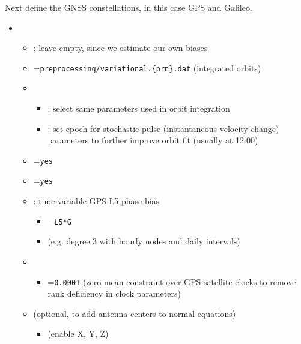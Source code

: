 Next define the GNSS constellations, in this case GPS and Galileo.
\begin{itemize}
  \item {}
  \begin{itemize}
    \item {}: leave empty, since we estimate our own biases
    \item {}=\verb|preprocessing/variational.{prn}.dat| (integrated orbits)
    \item {}
    \begin{itemize}
      \item {}:
            select same parameters used in orbit integration
      \item {}: set epoch for stochastic pulse (instantaneous velocity change) parameters to further
            improve orbit fit (usually at 12:00)
    \end{itemize}
    \item {}=\verb|yes|
    \item {}=\verb|yes|
    \item {}: time-variable GPS L5 phase bias
    \begin{itemize}
      \item {}=\verb|L5*G|
      \item {} (e.g. degree 3 with hourly nodes
            and daily intervals)
    \end{itemize}
    \item {}
    \begin{itemize}
      \item {}=\verb|0.0001| (zero-mean constraint over GPS satellite clocks to remove rank
            deficiency in clock parameters)
    \end{itemize}
    \item {} (optional, to add antenna centers to normal equations)
    \begin{itemize}
      \item {} (enable X, Y, Z)

\end{itemize}
\end{itemize}
\end{itemize}
